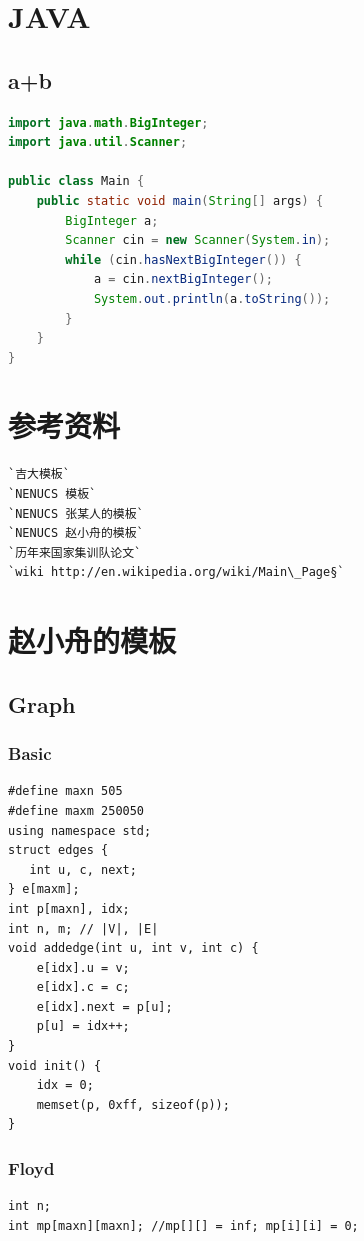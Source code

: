 \documentclass[a4paper]{article}
\begin{document}
\begin{CJK*}{UTF8}{gbsn}
\begin{multicols}{3}
\begin{flushleft}
\section{JAVA}
\subsection{a+b}
\begin{lstlisting}[language={Java}]
import java.math.BigInteger;
import java.util.Scanner;

public class Main {
    public static void main(String[] args) {
        BigInteger a;
        Scanner cin = new Scanner(System.in);
        while (cin.hasNextBigInteger()) {
            a = cin.nextBigInteger();
            System.out.println(a.toString());
        }
    }
}
\end{lstlisting}

\section{参考资料}
\begin{lstlisting}
`吉大模板`
`NENUCS 模板`
`NENUCS 张某人的模板`
`NENUCS 赵小舟的模板`
`历年来国家集训队论文`
`wiki http://en.wikipedia.org/wiki/Main\_Page§`
\end{lstlisting}




\section{赵小舟的模板}

\subsection{Graph}

\subsubsection{Basic}

\begin{lstlisting}
#define maxn 505
#define maxm 250050
using namespace std;
struct edges {
   int u, c, next;
} e[maxm];
int p[maxn], idx;
int n, m; // |V|, |E|
void addedge(int u, int v, int c) {
    e[idx].u = v;
    e[idx].c = c;
    e[idx].next = p[u];
    p[u] = idx++;
}
void init() {
    idx = 0;
    memset(p, 0xff, sizeof(p));
}
\end{lstlisting}

\subsubsection{Floyd}
\begin{lstlisting}
int n;
int mp[maxn][maxn]; //mp[][] = inf; mp[i][i] = 0;


\end{lstlisting}
\end{flushleft}
\end{multicols}
\end{CJK*}
\end{document}
